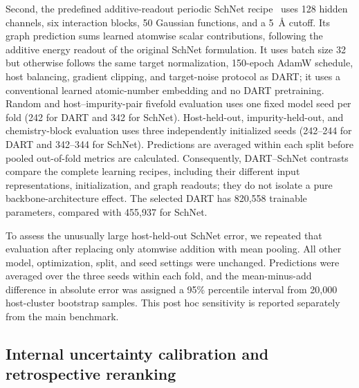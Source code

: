 Second, the predefined additive-readout periodic SchNet recipe~\cite{schutt2018}
uses 128 hidden
channels, six interaction blocks, 50 Gaussian functions, and a 5~\AA{} cutoff.
Its graph prediction sums learned atomwise scalar contributions,
following the additive energy readout of the original SchNet formulation.
It uses batch size 32 but otherwise follows the same target normalization,
150-epoch AdamW schedule, host balancing, gradient clipping, and target-noise
protocol as DART; it uses a conventional learned atomic-number embedding and
no DART pretraining.  Random and host--impurity-pair fivefold evaluation uses
one fixed model
seed per fold (242 for DART and 342 for SchNet).  Host-held-out,
impurity-held-out, and chemistry-block evaluation uses three independently
initialized seeds (242--244 for DART and 342--344 for SchNet).  Predictions
are averaged within each split before pooled out-of-fold metrics are
calculated.  Consequently, DART--SchNet contrasts compare the complete
learning recipes, including their different input
representations, initialization, and graph readouts; they do not isolate a pure
backbone-architecture effect.
The selected DART has 820,558 trainable parameters, compared with 455,937 for
SchNet.

To assess the unusually large host-held-out SchNet error, we repeated that
evaluation after replacing only atomwise addition with mean pooling.  All
other model, optimization, split, and seed settings were unchanged.
Predictions were averaged over the three seeds within each fold, and the
mean-minus-add difference in absolute error was assigned a 95\% percentile
interval from 20,000 host-cluster bootstrap samples.  This post hoc sensitivity
is reported separately from the main benchmark.

\subsection{Internal uncertainty calibration and retrospective reranking}
\label{sec:uq_method}

